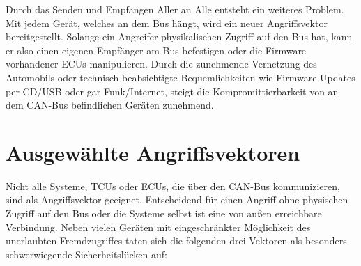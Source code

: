 \documentclass[
    fontsize=12pt,
    headings=small,
    parskip=half,           %
    bibliography=totoc,
    numbers=noenddot,       %
    open=any,               %
    ]{scrreprt}
\begin{document}
Durch das Senden und Empfangen Aller an Alle entsteht ein weiteres Problem. Mit jedem Gerät, welches an dem Bus hängt, wird ein neuer Angriffsvektor bereitgestellt.
Solange ein Angreifer physikalischen Zugriff auf den Bus hat, kann er also einen eigenen Empfänger am Bus befestigen oder die Firmware vorhandener ECUs manipulieren.
Durch die zunehmende Vernetzung des Automobils oder technisch beabsichtigte Bequemlichkeiten wie Firmware-Updates per CD/USB oder gar Funk/Internet, steigt die Kompromittierbarkeit von an dem CAN-Bus befindlichen Geräten zunehmend.


\section{Ausgewählte Angriffsvektoren}
Nicht alle Systeme, TCUs oder ECUs, die über den CAN-Bus kommunizieren, sind als Angriffsvektor geeignet. Entscheidend für einen Angriff ohne physischen Zugriff auf den Bus oder die Systeme selbst ist eine von außen erreichbare Verbindung. Neben vielen Geräten mit eingeschränkter Möglichkeit des unerlaubten Fremdzugriffes taten sich die folgenden drei Vektoren als besonders schwerwiegende Sicherheitslücken auf:
\end{document}
